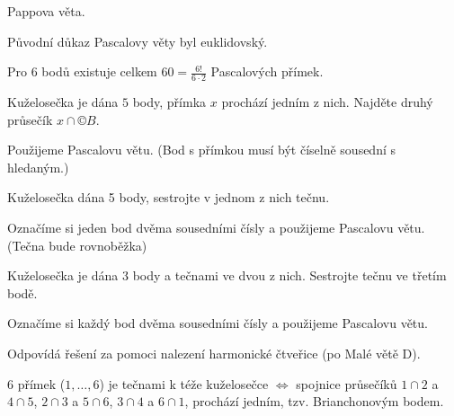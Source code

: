 \documentclass[12pt]{article}					%
\begin{document}
\begin{dusledek}
	Pappova věta.
\end{dusledek}

\begin{poznamka}[Historická]
	Původní důkaz Pascalovy věty byl euklidovský.
\end{poznamka}

\begin{poznamka}
	Pro $6$ bodů existuje celkem $60 = \frac{6!}{6·2}$ Pascalových přímek.
\end{poznamka}

\begin{priklad}[Konstrukce]
	Kuželosečka je dána $5$ body, přímka $x$ prochází jedním z nich. Najděte druhý průsečík $x \cap ©B$.

	\begin{reseni}
		Použijeme Pascalovu větu. (Bod s přímkou musí být číselně sousední s hledaným.)
	\end{reseni}
\end{priklad}

\begin{priklad}[Konstrukce]
	Kuželosečka dána 5 body, sestrojte v jednom z nich tečnu.

	\begin{reseni}
		Označíme si jeden bod dvěma sousedními čísly a použijeme Pascalovu větu. (Tečna bude rovnoběžka)
	\end{reseni}
\end{priklad}

\begin{priklad}[Konstrukce]
	Kuželosečka je dána 3 body a tečnami ve dvou z nich. Sestrojte tečnu ve třetím bodě.

	\begin{reseni}
		Označíme si každý bod dvěma sousedními čísly a použijeme Pascalovu větu.
	\end{reseni}

	\begin{poznamkain}
		Odpovídá řešení za pomoci nalezení harmonické čtveřice (po Malé větě D).
	\end{poznamkain}
\end{priklad}

\begin{veta}
	6 přímek ($1, …, 6$) je tečnami k téže kuželosečce $\Leftrightarrow$ spojnice průsečíků $1 \cap 2$ a $4 \cap 5$, $2 \cap 3$ a $5 \cap 6$, $3 \cap 4$ a $6 \cap 1$, prochází jedním, tzv. Brianchonovým bodem.
\end{veta}
\end{document}
